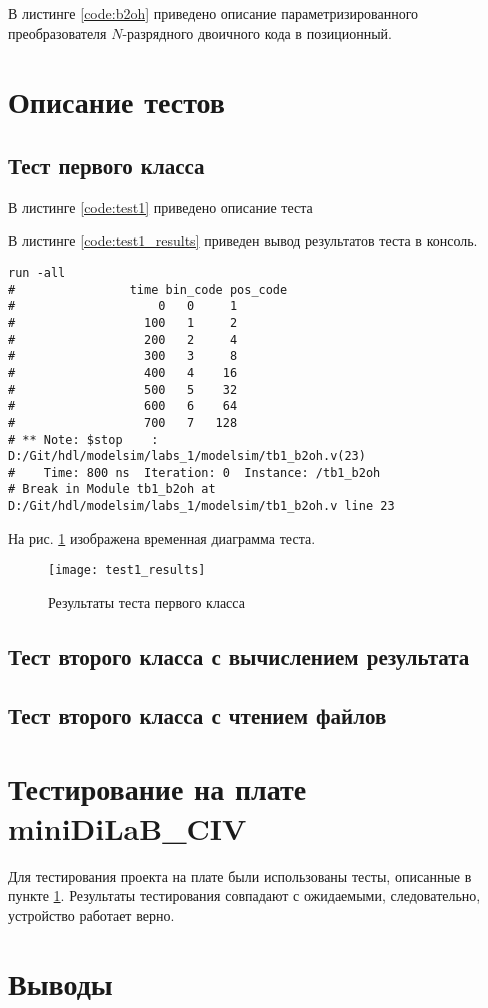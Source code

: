 В листинге \ref{code:b2oh} приведено описание параметризированного преобразователя $N$-разрядного двоичного кода в позиционный.


\section{Описание тестов}
\label{sec:tests}

\subsection{Тест первого класса}

В листинге \ref{code:test1} приведено описание теста 


В листинге \ref{code:test1_results} приведен вывод результатов теста в консоль.
\begin{lstlisting}[caption=Результаты теста первого класса, label=code:test1_results, language={}]
run -all
# 		         time bin_code pos_code
#                    0   0     1
#                  100   1     2
#                  200   2     4
#                  300   3     8
#                  400   4    16
#                  500   5    32
#                  600   6    64
#                  700   7   128
# ** Note: $stop    : D:/Git/hdl/modelsim/labs_1/modelsim/tb1_b2oh.v(23)
#    Time: 800 ns  Iteration: 0  Instance: /tb1_b2oh
# Break in Module tb1_b2oh at D:/Git/hdl/modelsim/labs_1/modelsim/tb1_b2oh.v line 23
\end{lstlisting}

На рис. \ref{fig:test1_results} изображена временная диаграмма теста.
\begin{figure}[H]
	\begin{center}
		\texttt{[image: test1\_results]}
		\caption{Результаты теста первого класса}
		\label{fig:test1_results}
	\end{center}
\end{figure}

\subsection{Тест второго класса с вычислением результата}

\subsection{Тест второго класса с чтением файлов}

\section{Тестирование на плате miniDiLaB\_CIV}

Для тестирования проекта на плате были использованы тесты, описанные в пункте \ref{sec:tests}. Результаты тестирования совпадают с ожидаемыми, следовательно, устройство работает верно.

\section{Выводы}

